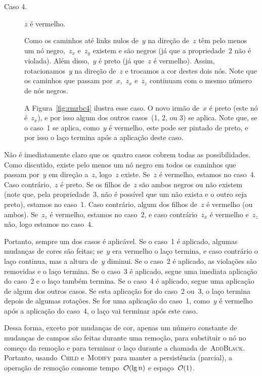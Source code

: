 \documentclass[main.tex]{subfiles}
\begin{document}
\begin{description}
	\item[Caso 4.] $z$ é vermelho.

	Como os caminhos até links nulos de~$y$ na direção de~$z$ têm pelo menos um nó negro,~$z_x$ e~$z_y$ existem e são negros (já que a propriedade~2 não é violada). Além disso,~$y$ é preto (já que~$z$ é vermelho). Assim, rotacionamos~$y$ na direção de~$z$ e trocamos a cor destes dois nós. Note que os caminhos que passam por~$x$,~$z_x$ e~$z_z$ continuam com o mesmo número de nós negros.

	A Figura~\ref{fig:rmrbc4} ilustra esse caso. O novo irmão de~$x$ é preto (este nó é~$z_x$), e por isso algum dos outros casos~(1, 2, ou 3) se aplica. Note que, se o caso~1 se aplica, como~$y$ é vermelho, este pode ser pintado de preto, e por isso o laço termina após a aplicação deste caso.


\end{description}

Não é imediatamente claro que os~quatro casos cobrem todas as possibilidades. Como discutido, existe pelo menos um nó negro em todos os caminhos que passam por~$y$ em direção a~$z$, logo~$z$ existe. Se~$z$ é vermelho, estamos no caso~4. Caso contrário,~$z$ é preto. Se os filhos de~$z$ são ambos negros ou não existem (note que, pela propriedade~3, não é possível que um não exista e o outro seja preto), estamos no caso~1. Caso contrário, algum dos filhos de~$z$ é vermelho (ou ambos). Se~$z_z$ é vermelho, estamos no caso~2, e caso contrário~$z_x$ é vermelho e~$z_z$ não, logo estamos no caso~4.

Portanto, sempre um dos casos é aplicável. Se o caso~1 é aplicado, algumas mudanças de cores são feitas; se~$y$ era vermelho o laço termina, e caso contrário o laço continua, mas a altura de~$y$ diminui. Se o caso~2 é aplicado, as violações são removidas e o laço termina. Se o caso~3 é aplicado, segue uma imediata aplicação do caso~2 e o laço também termina. Se o caso~4 é aplicado, segue uma aplicação de algum dos outros casos. Se esta aplicação for do caso~2 ou~3, o laço termina depois de algumas rotações. Se for uma aplicação do caso~1, como~$y$ é vermelho após a aplicação do caso~4, o laço vai terminar após este caso.

Dessa forma, exceto por mudanças de cor, apenas um número constante de mudanças de campos são feitas durante uma remoção, para substituir o nó no começo da remoção e para terminar o laço durante a chamada de~\textsc{AddBlack}. Portanto, usando~\textsc{Child} e~\textsc{Modify} para manter a persistência (parcial), a operação de remoção consome tempo~$\mathcal{O}(\lg n)$ e espaço~$\mathcal{O}(1)$.
\end{document}
